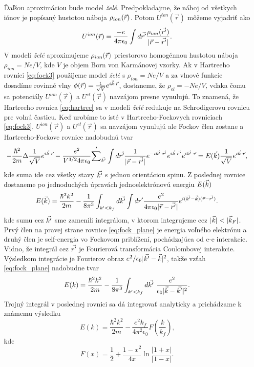 Ďaľšou aproximáciou bude model \emph{želé}. Predpokladajme,
 že náboj od všetkych iónov je popísaný hustotou náboja $\rho_{ion}(\vec{r})$. Potom $U^{ion}(\vec{r})$ môžeme vyjadriť ako
\begin{equation}
\label{eq:ion_pudding}
U^{ion}(\vec{r}) = \frac{-e}{4\pi \epsilon_0}\int d\vec{r'} \frac{\rho_{ion}(\vec{r'})}{|\vec{r}-\vec{r'}|} \text{.}
\end{equation}
V modeli \emph{želé} aproximujeme $\rho_{ion}(\vec{r})$ priestorovo homogénnou hustotou náboja $\rho_{ion}=Ne/V$, kde $V$ je objem Born von Karmánovej vzorky.
Ak v Hartreeho rovníci \eqref{eq:fock3} použijeme model \emph{želé} s $\rho_{ion}=Ne/V$ a za vlnové funkcie dosadíme rovinné vlny $\phi(\vec{r})=\frac{1}{\sqrt{V}}e^{i\vec{k}\cdot\vec{r}}$,
dostaneme, že $\rho_{el}=-Ne/V$, vďaka čomu sa potenciály $U^{ion}(\vec{r})$ a $U^{el}(\vec{r})$ navzájom presne vynulujú.
To znamená, že Hartreeho rovnica \eqref{eq:hartree} sa v modeli \emph{želé} redukuje na Schrodigerovu rovnicu pre volnú časticu.
Keď urobíme to isté v Hartreeho-Fockovych rovniciach \eqref{eq:fock3}, $U^{ion}(\vec{r})$ a $U^{el}(\vec{r})$ sa navzájom vynulujú
ale Fockov člen zostane a Hartreeho-Fockove rovnice nadobudnú tvar
\begin{equation}
\label{eq:fock_final}
-\frac{\hbar^2}{2m}\Delta \frac{1}{\sqrt V}e^{i\vec{k}\cdot\vec{r}}-\frac{e^2}{V^{3/2}4\pi\epsilon_0}{\sum'}_{\vec{k'}}\int d\vec{r'} \frac{1}{|\vec{r}-\vec{r'}|} e^{-i\vec{k'} \cdot \vec{r'} }e^{i\vec{k} \cdot \vec{r'}}e^{i\vec{k'} \cdot \vec{r}}=E(\vec{k})\frac{1}{\sqrt V}e^{i\vec{k} \cdot \vec{r}} \text{,}
\end{equation}
kde suma ide cez všetky stavy $\vec{k'}$ s jednou orientáciou spinu. Z poslednej rovnice dostaneme po jednoduchých úpravách
jednoelektrónovú energiu $E(\vec{k})$
\begin{equation}
\label{eq:fock_plane}
E(\vec{k})=\frac{\hbar^2 k^2}{2m}- \frac{1}{8\pi^3} \int_{k'<k_f} d \vec{k'}\int dr'\frac{e^2}{4\pi\epsilon_0|\vec{r}-\vec{r'}|} e^{i(\vec{k'}-\vec{k})(\vec{r}-\vec{r'})} \text{.}
\end{equation}
kde sumu cez $\vec{k'}$ sme zamenili integrálom, v ktorom integrujeme cez $|\vk|<|\vk_F|$. Prvý člen
na pravej strane rovnice \eqref{eq:fock_plane} je energia voľného elektrónu a druhý člen je self-energia vo Fockovom priblížení,
pochádzajúca od e-e interakcie.
Vidno, že integrál cez $\vec{r'}$ je Fourierová transformácia Coulombovej interakcie. Výsledkom integrácie je Fourierov obraz $e^2/\epsilon_0|\vec{k'}-\vec{k}|^2$, takže vzťah
\eqref{eq:fock_plane} nadobudne tvar
\begin{equation}
\label{eq:fock_plane2}
E(k)=\frac{\hbar^2 k^2}{2m}-\frac{1}{8\pi^3}  \int_{k'<k_f} d\vkp \ \frac{e^2}{\epsilon_0|\vk-\vkp|^2}\text{.}
\end{equation}
Trojný integrál v poslednej rovnici sa dá integrovať analyticky a prichádzame k známemu výsledku \cite{Mermin}
\begin{equation}
\label{eq:fock_erg}
E(k)=\frac{\hbar^2 k^2}{2m}- \frac{e^2 k_f}{4\pi^2\epsilon_0} F(\frac{k}{k_f}) \text{,}
\end{equation}
kde
\begin{equation}
\label{eq:fock_fx}
F(x)=\frac{1}{2}+\frac{1-x^2}{4x}\ln{\frac{|1+x|}{|1-x|}} \text{.}
\end{equation}

